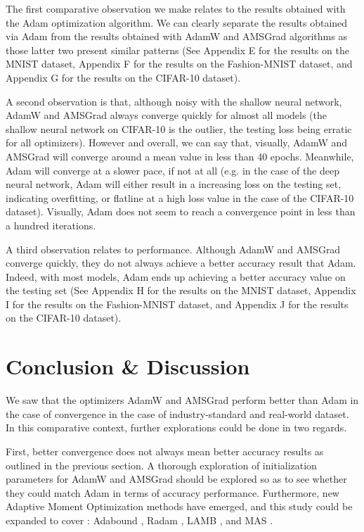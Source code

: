 \documentclass{article} %
\begin{document}
The first comparative observation we make relates to the results obtained with the Adam optimization 
algorithm. We can clearly separate the results obtained via Adam from the results obtained 
with AdamW and AMSGrad algorithms as those latter two present similar patterns (See Appendix E for the 
results on the MNIST dataset, Appendix F for the results on the Fashion-MNIST dataset, and
Appendix G for the results on the CIFAR-10 dataset).

A second observation is that, although noisy with the shallow neural network, AdamW and AMSGrad always 
converge quickly for almost all models (the shallow neural network on CIFAR-10 is the outlier, the testing
loss being erratic for all optimizers). However and overall, we can say that, visually, AdamW and AMSGrad
will converge around a mean value in less than 40 epochs. Meanwhile, Adam will converge at a slower pace, 
if not at all (e.g. in the case of the deep neural network, Adam will either result in a increasing loss 
on the testing set, indicating overfitting, or flatline at a high loss value in the case of the CIFAR-10
dataset). Visually, Adam does not seem to reach a convergence point in less than a hundred iterations.

A third observation relates to performance. Although AdamW and AMSGrad converge quickly, they do not 
always achieve a better accuracy result that Adam. Indeed, with most models, Adam ends up achieving 
a better accuracy value on the testing set (See Appendix H for the results on the MNIST dataset, Appendix I 
for the results on the Fashion-MNIST dataset, and Appendix J for the results on the CIFAR-10 dataset).

\section{Conclusion \& Discussion}
\label{discussion}

We saw that the optimizers AdamW and AMSGrad perform better than Adam in the case of convergence in the case
of industry-standard and real-world dataset. In this comparative context, further explorations could be done 
in two regards. 

First, better convergence does not always mean better accuracy results as outlined in the previous section.
A thorough exploration of initialization parameters for AdamW and AMSGrad should be explored so as to see whether
they could match Adam in terms of accuracy performance. Furthermore, new Adaptive Moment Optimization methods
have emerged, and this study could be expanded to cover : Adabound \citep{luo2019adaptive}, Radam 
\citep{liu2020variance}, LAMB \citep{you2020large}, and MAS \citep{landro2020mixing}.
\end{document}
